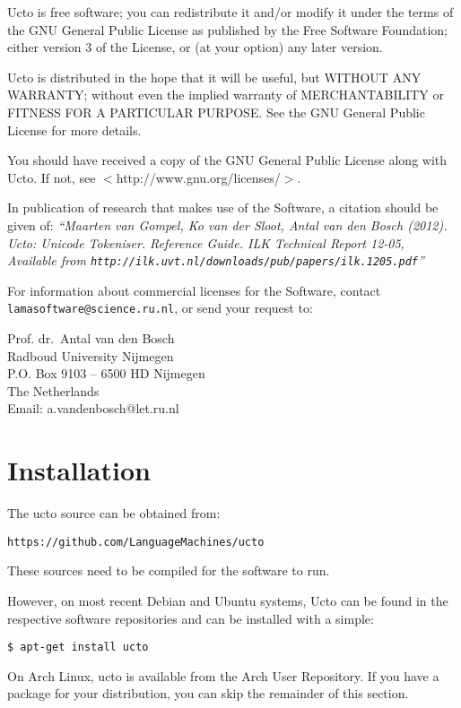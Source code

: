 \documentclass[a4paper,12pt]{report}
\begin{document}
Ucto is free software; you can redistribute it and/or modify it under the terms of the GNU General Public License as published by the Free
Software Foundation; either version 3 of the License, or (at your option) any later version.

Ucto is distributed in the hope that it will be useful, but WITHOUT ANY WARRANTY; without even the implied warranty of MERCHANTABILITY or FITNESS FOR A PARTICULAR PURPOSE.  See the GNU General Public License for more details.

You should have received a copy of the GNU General Public License along with Ucto.  If not, see $<$http://www.gnu.org/licenses/$>$.

In publication of research that makes use of the Software, a citation should be given of: {\em ``Maarten van Gompel, Ko van der Sloot, Antal van den Bosch (2012). Ucto: Unicode Tokeniser. Reference Guide. ILK Technical Report 12-05, \\ Available from {\tt http://ilk.uvt.nl/downloads/pub/papers/ilk.1205.pdf}''}

For information about commercial licenses for the Software, contact {\tt
lamasoftware@science.ru.nl}, or send your request to:

{\footnotesize
Prof. dr.~Antal van den Bosch\\
Radboud University Nijmegen \\
P.O. Box 9103  -- 6500 HD Nijmegen \\ 
The Netherlands \\
Email: a.vandenbosch@let.ru.nl}
 
\pagestyle{headings}

\chapter{Installation}
\vspace{-1cm}

The ucto source can be obtained from:

{\tt https://github.com/LanguageMachines/ucto}

These sources need to be compiled for the software to run.

However, on most recent Debian and Ubuntu systems, Ucto can be found in the respective software repositories and can be installed with a simple:

{\tt \$ apt-get install ucto}    

On Arch Linux, ucto is available from the Arch User Repository. If you have a
package for your distribution, you can skip the remainder of this section.
\end{document}
